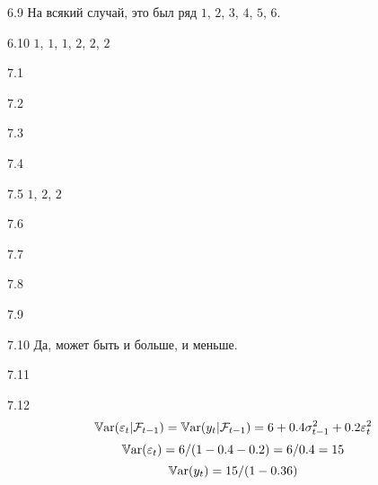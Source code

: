 \protect \hypertarget {soln:6.9}{}
\begin{solution}{{6.9}}
     На всякий случай, это был ряд $1$, $2$, $3$, $4$, $5$, $6$.
   
\end{solution}
\protect \hypertarget {soln:6.10}{}
\begin{solution}{{6.10}}
   $1$, $1$, $1$, $2$, $2$, $2$
   
\end{solution}
\protect \hypertarget {soln:7.1}{}
\begin{solution}{{7.1}}
\end{solution}
\protect \hypertarget {soln:7.2}{}
\begin{solution}{{7.2}}

\end{solution}
\protect \hypertarget {soln:7.3}{}
\begin{solution}{{7.3}}

\end{solution}
\protect \hypertarget {soln:7.4}{}
\begin{solution}{{7.4}}

\end{solution}
\protect \hypertarget {soln:7.5}{}
\begin{solution}{{7.5}}
$1$, $2$, $2$
\end{solution}
\protect \hypertarget {soln:7.6}{}
\begin{solution}{{7.6}}
\end{solution}
\protect \hypertarget {soln:7.7}{}
\begin{solution}{{7.7}}
\end{solution}
\protect \hypertarget {soln:7.8}{}
\begin{solution}{{7.8}}
\end{solution}
\protect \hypertarget {soln:7.9}{}
\begin{solution}{{7.9}}
\end{solution}
\protect \hypertarget {soln:7.10}{}
\begin{solution}{{7.10}}
Да, может быть и больше, и меньше.
\end{solution}
\protect \hypertarget {soln:7.11}{}
\begin{solution}{{7.11}}

\end{solution}
\protect \hypertarget {soln:7.12}{}
\begin{solution}{{7.12}}
\[
\operatorname{\mathbb{V}\mathrm{ar}}(\varepsilon_t | \mathcal{F}_{t-1}) = \operatorname{\mathbb{V}\mathrm{ar}}(y_t| \mathcal{F}_{t-1}) = 6 + 0.4 \sigma^2_{t-1} + 0.2\varepsilon_t^2
\]
\[
\operatorname{\mathbb{V}\mathrm{ar}}(\varepsilon_t) = 6/(1-0.4-0.2)=6/0.4=15
\]
\[
\operatorname{\mathbb{V}\mathrm{ar}}(y_t)=15/(1-0.36)
\]
\end{solution}
